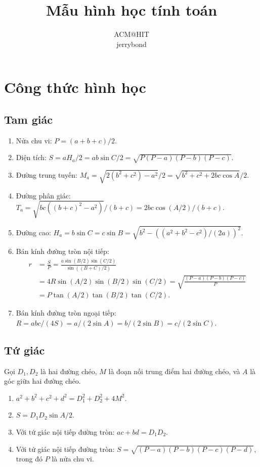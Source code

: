 \documentclass[11pt]{article}
\title{Mẫu hình học tính toán}
\author{ACM@HIT\\jerrybond}
\date{}
\begin{document}
\maketitle
\tableofcontents

\section{Công thức hình học}

\subsection{Tam giác}
\begin{enumerate}
\item Nửa chu vi: $P=(a+b+c)/2$.
\item Diện tích: $S=aH_a/2=ab\sin C/2=\sqrt{P(P-a)(P-b)(P-c)}$.
\item Đường trung tuyến: $M_a=\sqrt{2(b^2+c^2)-a^2}/2=\sqrt{b^2+c^2+2bc\cos A}/2$.
\item Đường phân giác: $T_a=\sqrt{bc((b+c)^2-a^2)}/(b+c)=2bc\cos(A/2)/(b+c)$.
\item Đường cao: $H_a=b\sin C=c\sin B=\sqrt{b^2-\left((a^2+b^2-c^2)/(2a)\right)^2}$.
\item Bán kính đường tròn nội tiếp:
\[
\begin{aligned}
 r&=\frac{S}{P}
 =\frac{a\sin(B/2)\sin(C/2)}{\sin((B+C)/2)}\\
 &=4R\sin(A/2)\sin(B/2)\sin(C/2)
 =\sqrt{\frac{(P-a)(P-b)(P-c)}{P}}\\
 &=P\tan(A/2)\tan(B/2)\tan(C/2).
\end{aligned}
\]
\item Bán kính đường tròn ngoại tiếp: $R=abc/(4S)=a/(2\sin A)=b/(2\sin B)=c/(2\sin C)$.
\end{enumerate}

\subsection{Tứ giác}
Gọi $D_1,D_2$ là hai đường chéo, $M$ là đoạn nối trung điểm hai đường chéo, và $A$ là góc giữa hai đường chéo.
\begin{enumerate}
\item $a^2+b^2+c^2+d^2=D_1^2+D_2^2+4M^2$.
\item $S=D_1D_2\sin A/2$.
\item Với tứ giác nội tiếp đường tròn: $ac+bd=D_1D_2$.
\item Với tứ giác nội tiếp đường tròn: $S=\sqrt{(P-a)(P-b)(P-c)(P-d)}$, trong đó $P$ là nửa chu vi.
\end{enumerate}
\end{document}
